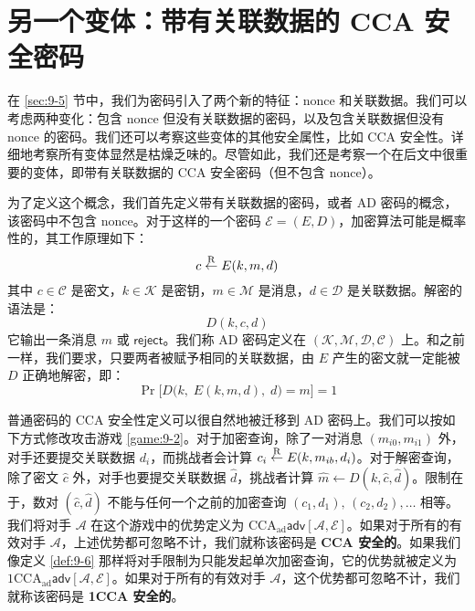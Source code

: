 \section{另一个变体：带有关联数据的 CCA 安全密码}\label{sec:9-6}

在 \ref{sec:9-5} 节中，我们为密码引入了两个新的特征：nonce 和关联数据。我们可以考虑两种变化：包含 nonce 但没有关联数据的密码，以及包含关联数据但没有 nonce 的密码。我们还可以考察这些变体的其他安全属性，比如 CCA 安全性。详细地考察所有变体显然是枯燥乏味的。尽管如此，我们还是考察一个在后文中很重要的变体，即带有关联数据的 CCA 安全密码（但不包含 nonce）。

为了定义这个概念，我们首先定义带有关联数据的密码，或者 AD 密码的概念，该密码中不包含 nonce。对于这样的一个密码 $\mathcal{E}=(E,D)$，加密算法可能是概率性的，其工作原理如下：
\[
c\overset{\rm R}\leftarrow E(k,m,d)
\]
其中 $c\in\mathcal{C}$ 是密文，$k\in\mathcal{K}$ 是密钥，$m\in\mathcal{M}$ 是消息，$d\in\mathcal{D}$ 是关联数据。解密的语法是：
\[
D(k,c,d)
\]
它输出一条消息 $m$ 或 $\mathsf{reject}$。我们称 AD 密码定义在 $(\mathcal{K},\mathcal{M},\mathcal{D},\mathcal{C})$ 上。和之前一样，我们要求，只要两者被赋予相同的关联数据，由 $E$ 产生的密文就一定能被 $D$ 正确地解密，即：
\[
\Pr\big[D\big(k,\;E(k,m,d),\;d\big)=m\big]=1
\]

\begin{definition}\label{def:9-10}
普通密码的 CCA 安全性定义可以很自然地被迁移到 AD 密码上。我们可以按如下方式修改攻击游戏 \ref{game:9-2}。对于加密查询，除了一对消息 $(m_{i0},m_{i1})$ 外，对手还要提交关联数据 $d_i$，而挑战者会计算 $c_i\overset{\rm R}\leftarrow E(k,m_{ib},d_i)$。对于解密查询，除了密文 $\hat{c}$ 外，对手也要提交关联数据 $\hat{d}$，挑战者计算 $\hat{m}\leftarrow D(k,\hat{c},\hat{d})$。限制在于，数对 $(\hat{c},\hat{d})$ 不能与任何一个之前的加密查询 $(c_1,d_1),\,(c_2,d_2),\dots$ 相等。我们将对手 $\mathcal{A}$ 在这个游戏中的优势定义为 $\mathrm{CCA}_\mathrm{ad}\mathsf{adv}[\mathcal{A},\mathcal{E}]$。如果对于所有的有效对手 $\mathcal{A}$，上述优势都可忽略不计，我们就称该密码是 \textbf{CCA 安全的}。如果我们像定义 \ref{def:9-6} 那样将对手限制为只能发起单次加密查询，它的优势就被定义为 $\mathrm{1CCA}_\mathrm{ad}\mathsf{adv}[\mathcal{A},\mathcal{E}]$。如果对于所有的有效对手 $\mathcal{A}$，这个优势都可忽略不计，我们就称该密码是 \textbf{1CCA 安全的}。
\end{definition}


